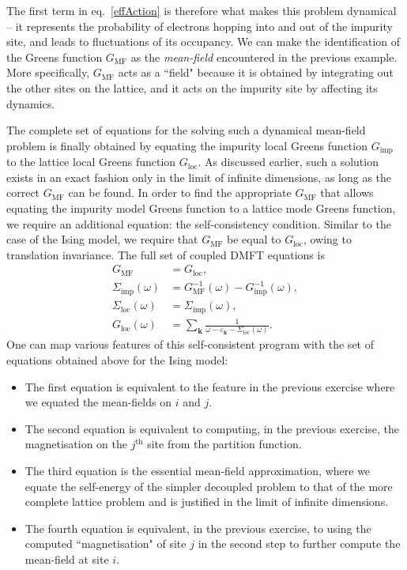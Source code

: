 The first term in eq.~\ref{effAction} is therefore what makes this problem dynamical -- it represents the probability of electrons hopping into and out of the impurity site, and leads to fluctuations of its occupancy. We can make the identification of the Greens function \(G_\text{MF}\) as the {\it mean-field} encountered in the previous example. More specifically, \(G_\text{MF}\) acts as a ``field" because it is obtained by integrating out the other sites on the lattice, and it acts on the impurity site by affecting its dynamics.

The complete set of equations for the solving such a dynamical mean-field problem is finally obtained by equating the impurity local Greens function \(G_\text{imp}\) to the lattice local Greens function \(G_\text{loc}\). As discussed earlier, such a solution exists in an exact fashion only in the limit of infinite dimensions, as long as the correct \(G_\text{MF}\) can be found. In order to find the appropriate \(G_\text{MF}\) that allows equating the impurity model Greens function to a lattice mode Greens function, we require an additional equation: the self-consistency condition. Similar to the case of the Ising model, we require that \(G_\text{MF}\) be equal to \(G_\text{loc}\), owing to translation invariance. The full set of coupled DMFT equations is
\begin{equation}\begin{aligned}
	G_\text{MF}	&= G_\text{loc},\\
	\Sigma_\text{imp}(\omega) &= G_\text{MF}^{-1}(\omega) - G^{-1}_{\text{imp}}(\omega),\\
	\Sigma_\text{loc}(\omega) &= \Sigma_\text{imp}(\omega),\\
	G_{\text{loc}}(\omega) &= \sum_{\mathbf{k}} \frac{1}{\omega - \varepsilon_{\mathbf{k}} - \Sigma_\text{loc}(\omega)}.
\end{aligned}\end{equation}
One can map various features of this self-consistent program with the set of equations obtained above for the Ising model:
\begin{itemize}
	\item The first equation is equivalent to the feature in the previous exercise where we equated the mean-fields on \(i\) and \(j\).
	\item The second equation is equivalent to computing, in the previous exercise, the magnetisation on the \(j^\text{th}\) site from the partition function.
	\item The third equation is the essential mean-field approximation, where we equate the self-energy of the simpler decoupled problem to that of the more complete lattice problem and is justified in the limit of infinite dimensions.
	\item The fourth equation is equivalent, in the previous exercise, to using the computed ``magnetisation" of site \(j\) in the second step to further compute the mean-field at site \(i\).
\end{itemize}


